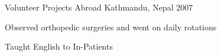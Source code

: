 \begin{cventries}

\cventry
{Volunteer} %
{Projects Abroad} %
{Kathmandu, Nepal} %
{2007} %
{ %
\begin{cvitems}
\item {Observed orthopedic surgeries and went on daily rotations}
\item {Taught English to In-Patients}
\end{cvitems} 
}



\end{cventries}
